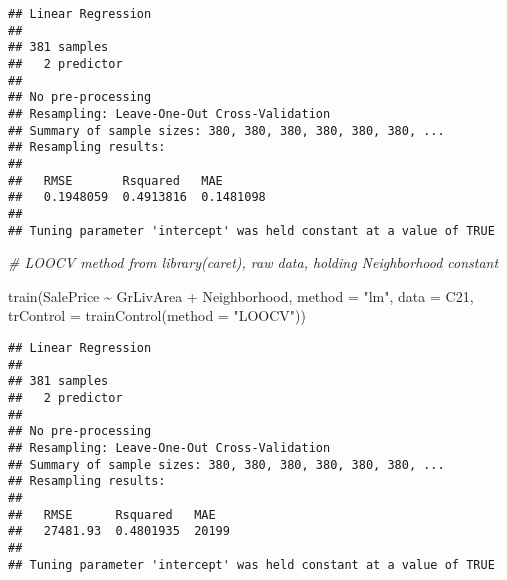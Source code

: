 \documentclass[
]{article}
\newenvironment{Shaded}{\begin{snugshade}}{\end{snugshade}}
\newcommand{\AttributeTok}[1]{\textcolor[rgb]{0.77,0.63,0.00}{#1}}
\newcommand{\CommentTok}[1]{\textcolor[rgb]{0.56,0.35,0.01}{\textit{#1}}}
\newcommand{\FunctionTok}[1]{\textcolor[rgb]{0.00,0.00,0.00}{#1}}
\newcommand{\NormalTok}[1]{#1}
\newcommand{\SpecialCharTok}[1]{\textcolor[rgb]{0.00,0.00,0.00}{#1}}
\newcommand{\StringTok}[1]{\textcolor[rgb]{0.31,0.60,0.02}{#1}}
\begin{document}
\begin{verbatim}
## Linear Regression 
## 
## 381 samples
##   2 predictor
## 
## No pre-processing
## Resampling: Leave-One-Out Cross-Validation 
## Summary of sample sizes: 380, 380, 380, 380, 380, 380, ... 
## Resampling results:
## 
##   RMSE       Rsquared   MAE      
##   0.1948059  0.4913816  0.1481098
## 
## Tuning parameter 'intercept' was held constant at a value of TRUE
\end{verbatim}

\begin{Shaded}
\begin{Highlighting}[]
\CommentTok{\# LOOCV method from library(caret), raw data, holding Neighborhood constant}

\FunctionTok{train}\NormalTok{(SalePrice }\SpecialCharTok{\textasciitilde{}}\NormalTok{ GrLivArea }\SpecialCharTok{+}\NormalTok{ Neighborhood, }\AttributeTok{method =} \StringTok{"lm"}\NormalTok{, }\AttributeTok{data =}\NormalTok{ C21, }\AttributeTok{trControl =} \FunctionTok{trainControl}\NormalTok{(}\AttributeTok{method =} \StringTok{"LOOCV"}\NormalTok{))}
\end{Highlighting}
\end{Shaded}

\begin{verbatim}
## Linear Regression 
## 
## 381 samples
##   2 predictor
## 
## No pre-processing
## Resampling: Leave-One-Out Cross-Validation 
## Summary of sample sizes: 380, 380, 380, 380, 380, 380, ... 
## Resampling results:
## 
##   RMSE      Rsquared   MAE  
##   27481.93  0.4801935  20199
## 
## Tuning parameter 'intercept' was held constant at a value of TRUE
\end{verbatim}
\end{document}
